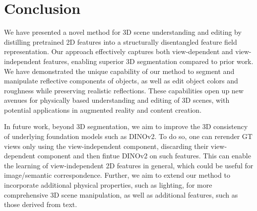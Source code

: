 \section{Conclusion} \label{sec:conclusion}

We have presented a novel method for 3D scene understanding and editing by distilling pretrained 2D features into a structurally disentangled feature field representation. Our approach effectively captures both view-dependent and view-independent features, enabling superior 3D segmentation compared to prior work. We have demonstrated the unique capability of our method to segment and manipulate reflective components of objects, as well as edit object colors and roughness while preserving realistic reflections. These capabilities open up new avenues for physically based understanding and editing of 3D scenes, with potential applications in augmented reality and content creation.

In future work, beyond 3D segmentation, we aim to improve the 3D consistency of underlying foundation models such as DINOv2. To do so, one can rerender GT views only using the view-independent component, discarding their view-dependent component and then fintue DINOv2 on such features. This can enable the learning of view-independent 2D features in general, which could be useful for image/semantic correspondence. Further, we aim to extend our method to incorporate additional physical properties, such as lighting, for more comprehensive 3D scene manipulation, as well as additional features, such as those derived from text. 
